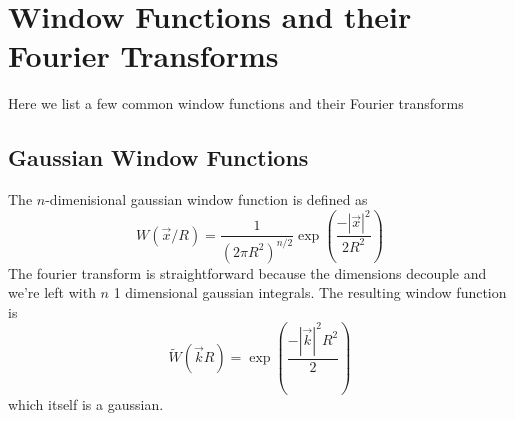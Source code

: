 \documentclass[12pt,preprint]{aastex}			%
\begin{document}

\newpage
\appendix
\section{Window Functions and their Fourier Transforms}
\label{Wtransforms}
Here we list a few common window functions and their Fourier transforms
\subsection{Gaussian Window Functions}
The $n$-dimenisional gaussian window function is defined as
\begin{equation}
  W(\vec x/R) = \frac{1}{(2\pi R^2)^{n/2}}
  \exp\left(\frac{-|\vec x|^2}{2R^2}\right)
\end{equation}
The fourier transform is straightforward because the dimensions decouple
and we're left with $n$ 1 dimensional gaussian integrals.  The resulting
window function is
\begin{equation}
  \widetilde{W}(\vec k R) 
  = \exp\left(\frac{-|\vec k|^2R^2}{2}\right)
\end{equation}
which itself is a gaussian.
\end{document}
